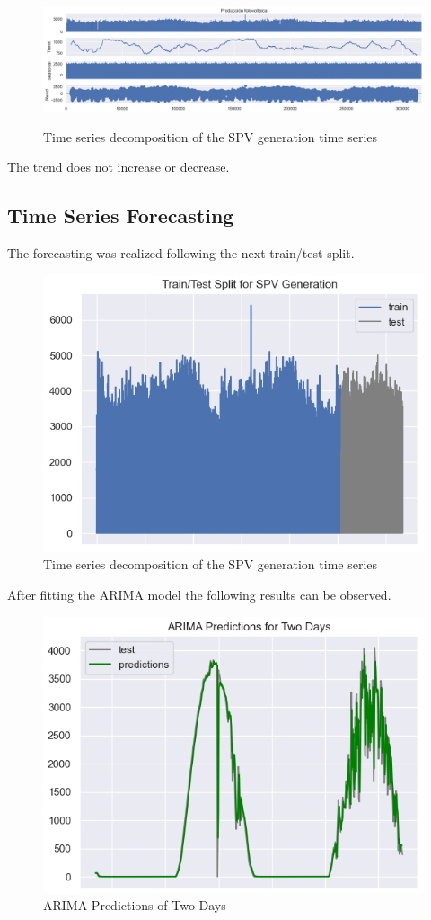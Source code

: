\documentclass[a4paper,12pt]{article}
\begin{document}
\begin{figure}[H] %
    \centering %
    \caption{Time series decomposition of the SPV generation time series} %
    \includegraphics[width=1\textwidth]{decomposition.png} %
    \label{fig:etiqueta_imagen} %
\end{figure} 

The trend does not increase or decrease.

\subsection{Time Series Forecasting}
The forecasting was realized following the next train/test split.

\begin{figure}[H] %
    \centering %
    \includegraphics[height=0.35\textwidth]{traintest.png} %
    \caption{Time series decomposition of the SPV generation time series} %
    \label{fig:etiqueta_imagen} %
\end{figure} 

After fitting the ARIMA model the following results can be observed.

\begin{figure}[H] %
    \centering %
    \includegraphics[height=0.35\textwidth]{ARIMA.png} %
    \caption{ARIMA Predictions of Two Days} %
    \label{fig:etiqueta_imagen} %
\end{figure} 
\end{document}
